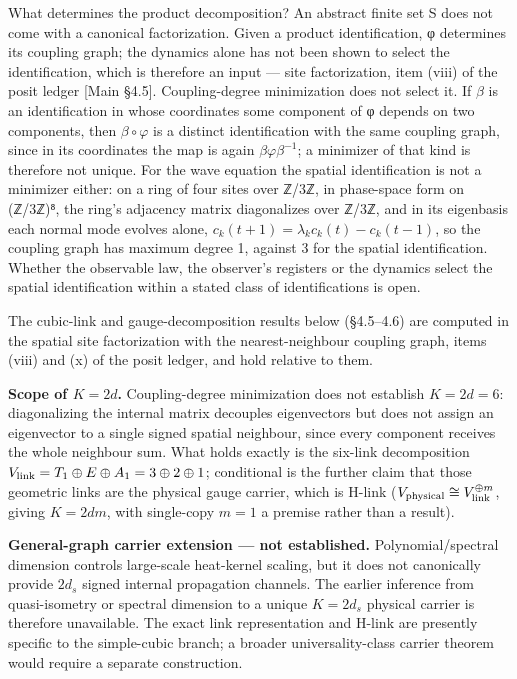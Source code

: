 \documentclass[
]{article}
\begin{document}
What determines the product decomposition? An abstract finite set S does
not come with a canonical factorization. Given a product identification,
φ determines its coupling graph; the dynamics alone has not been shown
to select the identification, which is therefore an input --- site
factorization, item (viii) of the posit ledger {[}Main §4.5{]}.
Coupling-degree minimization does not select it. If \(\beta\) is an
identification in whose coordinates some component of φ depends on two
components, then \(\beta\circ\varphi\) is a distinct identification with
the same coupling graph, since in its coordinates the map is again
\(\beta\varphi\beta^{-1}\); a minimizer of that kind is therefore not
unique. For the wave equation the spatial identification is not a
minimizer either: on a ring of four sites over ℤ/3ℤ, in phase-space form
on (ℤ/3ℤ)⁸, the ring's adjacency matrix diagonalizes over ℤ/3ℤ, and in
its eigenbasis each normal mode evolves alone,
\(c_k(t+1) = \lambda_k c_k(t) - c_k(t-1)\), so the coupling graph has
maximum degree 1, against 3 for the spatial identification. Whether the
observable law, the observer's registers or the dynamics select the
spatial identification within a stated class of identifications is open.

The cubic-link and gauge-decomposition results below (§4.5--4.6) are
computed in the spatial site factorization with the nearest-neighbour
coupling graph, items (viii) and (x) of the posit ledger, and hold
relative to them.

\textbf{Scope of \(K = 2d\).} Coupling-degree minimization does not
establish \(K=2d=6\): diagonalizing the internal matrix decouples
eigenvectors but does not assign an eigenvector to a single signed
spatial neighbour, since every component receives the whole neighbour
sum. What holds exactly is the six-link decomposition
\(V_{\rm link}=T_1\oplus E\oplus A_1=3\oplus2\oplus1\); conditional is
the further claim that those geometric links are the physical gauge
carrier, which is H-link
(\(V_{\rm physical}\cong V_{\rm link}^{\oplus m}\), giving \(K=2dm\),
with single-copy \(m=1\) a premise rather than a result).

\textbf{General-graph carrier extension --- not established.}
Polynomial/spectral dimension controls large-scale heat-kernel scaling,
but it does not canonically provide \(2d_s\) signed internal propagation
channels. The earlier inference from quasi-isometry or spectral
dimension to a unique \(K=2d_s\) physical carrier is therefore
unavailable. The exact link representation and H-link are presently
specific to the simple-cubic branch; a broader universality-class
carrier theorem would require a separate construction.
\end{document}
